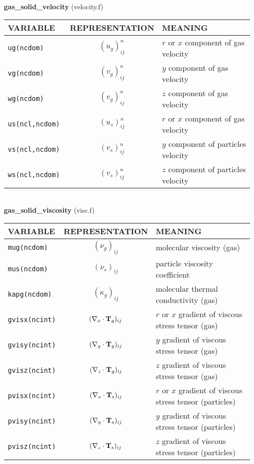 %
%
{\large {\bf gas\_solid\_velocity}} (velocity.f)\\[5mm]
\begin{tabular}{|p{6cm}|c|p{6cm}|}\hline
VARIABLE & REPRESENTATION & MEANING\\\hline
\tt ug(ncdom) & $(u_g)^n_{ij}$ &   $r$ or $x$ component of gas velocity\\\hline
\tt vg(ncdom) & $(v_g)^n_{ij}$ &  $y$ component of gas velocity\\\hline
\tt wg(ncdom) & $(v_g)^n_{ij}$ &  $z$ component of gas velocity\\\hline
\tt us(ncl,ncdom) & $(u_s)^n_{ij}$ &   $r$ or $x$ component of gas velocity\\\hline
\tt vs(ncl,ncdom) & $(v_s)^n_{ij}$ &  $y$ component of particles velocity\\\hline
\tt ws(ncl,ncdom) & $(v_s)^n_{ij}$ &  $z$ component of particles velocity\\\hline
\end{tabular}\\[5mm]
%
%
{\large{\bf gas\_solid\_viscosity}} (visc.f)\\[5mm]
\begin{tabular}{|p{6cm}|c|p{6cm}|}\hline
VARIABLE & REPRESENTATION & MEANING\\\hline
\tt mug(ncdom)& $(\nu_g)_{ij}$ &   molecular viscosity (gas)\\\hline
\tt mus(ncdom)& $(\nu_s)_{ij}$ &   particle viscosity coefficient \\\hline
\tt kapg(ncdom)& $(\kappa_g)_{ij}$ &   molecular thermal conductivity (gas)\\\hline
\tt gvisx(ncint)& $(\nabla_x\cdot{\bf T}_g)_{ij}$ & $r$ or $x$ gradient of viscous stress tensor (gas)\\\hline
\tt gvisy(ncint)& $(\nabla_y\cdot{\bf T}_g)_{ij}$&  $y$ gradient of viscous stress tensor (gas)\\\hline
\tt gvisz(ncint)& $(\nabla_z\cdot{\bf T}_g)_{ij}$&  $z$ gradient of viscous stress tensor (gas)\\\hline
\tt pvisx(ncint)& $(\nabla_x\cdot{\bf T}_s)_{ij}$&  $r$ or $x$ gradient of viscous stress tensor (particles)\\\hline
\tt pvisy(ncint)& $(\nabla_y\cdot{\bf T}_s)_{ij}$&  $y$ gradient of viscous stress tensor (particles)\\\hline
\tt pvisz(ncint)& $(\nabla_z\cdot{\bf T}_s)_{ij}$&  $z$ gradient of viscous stress tensor (particles)\\\hline
\end{tabular}\\
